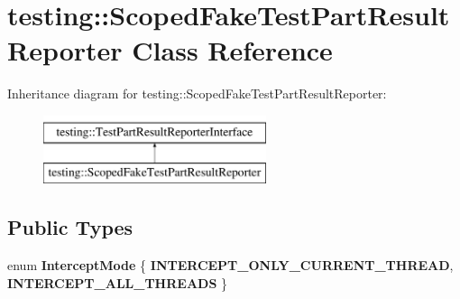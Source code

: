 \hypertarget{classtesting_1_1_scoped_fake_test_part_result_reporter}{}\section{testing\+:\+:Scoped\+Fake\+Test\+Part\+Result\+Reporter Class Reference}
\label{classtesting_1_1_scoped_fake_test_part_result_reporter}
Inheritance diagram for testing\+:\+:Scoped\+Fake\+Test\+Part\+Result\+Reporter\+:\begin{figure}[H]
\begin{center}
\leavevmode
\includegraphics[height=2.000000cm]{classtesting_1_1_scoped_fake_test_part_result_reporter}
\end{center}
\end{figure}
\subsection*{Public Types}
\begin{DoxyCompactItemize}
\item 
\mbox{\label{classtesting_1_1_scoped_fake_test_part_result_reporter_a82f6209b3cf5c4b15ec8bd8041dbc2d5}} 
enum {\bfseries Intercept\+Mode} \{ {\bfseries I\+N\+T\+E\+R\+C\+E\+P\+T\+\_\+\+O\+N\+L\+Y\+\_\+\+C\+U\+R\+R\+E\+N\+T\+\_\+\+T\+H\+R\+E\+AD}, 
{\bfseries I\+N\+T\+E\+R\+C\+E\+P\+T\+\_\+\+A\+L\+L\+\_\+\+T\+H\+R\+E\+A\+DS}
 \}
\end{DoxyCompactItemize}
